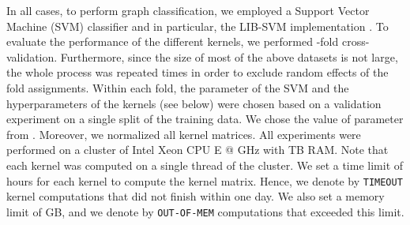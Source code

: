 \documentclass[twoside,11pt]{article}
\begin{document}
In all cases, to perform graph classification, we employed a Support Vector Machine (SVM) classifier and in particular, the LIB-SVM implementation \cite{chang2011libsvm}.
To evaluate the performance of the different kernels, we performed -fold cross-validation.
Furthermore, since the size of most of the above datasets is not large, the whole process was repeated  times in order to exclude random effects of the fold assignments.
Within each fold, the parameter  of the SVM and the hyperparameters of the kernels (see below) were chosen based on a validation experiment on a single  split of the training data.
We chose the value of parameter  from .
Moreover, we normalized all kernel matrices.
All experiments were performed on a cluster of  Intel\textsuperscript{\textcopyright} Xeon\textsuperscript{\textcopyright} CPU E @ GHz with TB RAM.
Note that each kernel was computed on a single thread of the cluster.
We set a time limit of  hours for each kernel to compute the kernel matrix.
Hence, we denote by \texttt{TIMEOUT} kernel computations that did not finish within one day.
We also set a memory limit of GB, and we denote by \texttt{OUT-OF-MEM} computations that exceeded this limit.
\end{document}
